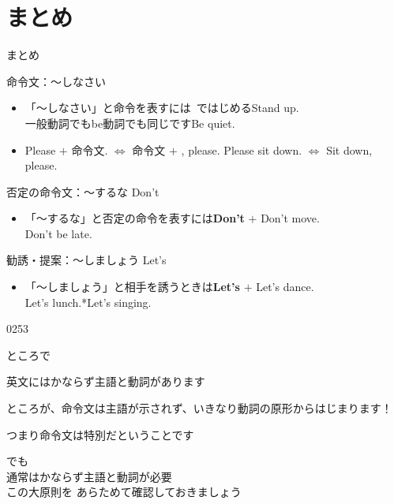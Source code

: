 \documentclass[aspectratio=169,xcolor={dvipsnames,table}]{beamer}
\begin{document}
\section{まとめ}
\begin{frame}[plain]{まとめ}

 \begin{block}{命令文：～しなさい}

\begin{itemize}[square]\small
 \item 「～しなさい」と命令を表すには\,\,\,ではじめる\hfill{\scriptsize Stand up.}\\
{\scriptsize 一般動詞でもbe動詞でも同じです}\hfill{\scriptsize Be quiet.}\\
 \item Please $+$ 命令文. $\Longleftrightarrow$ 命令文 $+$ , please.%
\hfill{\scriptsize Please sit down. $\Longleftrightarrow$ Sit down, please.}\\
\end{itemize}
  \end{block}


\begin{block}{否定の命令文：～するな Don't }
\begin{itemize}[square]\small
 \item 「～するな」と否定の命令を表すには\textbf{Don't} $+$ \hfill{\scriptsize Don't move.}\\
\hfill{\scriptsize Don't be late.}
 \end{itemize}
    \end{block}

\begin{block}{勧誘・提案：～しましょう Let's }
\begin{itemize}[square]\small
 \item 「～しましょう」と相手を誘うときは\textbf{Let's} $+$ \hfill{\scriptsize Let's dance.}\\
\hfill{\scriptsize *Let's lunch.\hspace{20pt}*Let's singing.}
 \end{itemize}
     \end{block}
\hfill{\tiny 0253}\,{\scriptsize {}}
\end{frame}
\begin{frame}[plain]{ところで}

\textdbend

 英文にはかならず主語と動詞があります\pause

ところが、命令文は主語が示されず、いきなり動詞の原形からはじまります！\pause

つまり命令文は特別だということです\pause

\bigskip

でも\\
通常はかならず主語と動詞が必要\\
この大原則を
あらためて確認しておきましょう
\end{frame}
\end{document}
